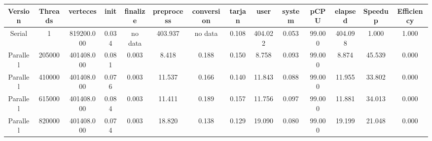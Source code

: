 \begin{tabular}{|c|c|c|c|c|c|c|c|c|c|c|c|c|c|}
\toprule
 Version &  Threads &   verteces &  init & finalize &  preprocess & conversion &  tarjan &    user &  system &   pCPU &  elapsed &  Speedup &  Efficiency \\
\midrule
  Serial &        1 & 819200.000 & 0.034 &  no data &     403.937 &    no data &   0.108 & 404.022 &   0.053 & 99.000 &  404.098 &    1.000 &       1.000 \\
Parallel &   205000 & 401408.000 & 0.081 &    0.003 &       8.418 &      0.188 &   0.150 &   8.758 &   0.093 & 99.000 &    8.874 &   45.539 &       0.000 \\
Parallel &   410000 & 401408.000 & 0.076 &    0.003 &      11.537 &      0.166 &   0.140 &  11.843 &   0.088 & 99.000 &   11.955 &   33.802 &       0.000 \\
Parallel &   615000 & 401408.000 & 0.084 &    0.003 &      11.411 &      0.189 &   0.157 &  11.756 &   0.097 & 99.000 &   11.881 &   34.013 &       0.000 \\
Parallel &   820000 & 401408.000 & 0.074 &    0.003 &      18.820 &      0.138 &   0.129 &  19.090 &   0.080 & 99.000 &   19.199 &   21.048 &       0.000 \\
\bottomrule
\end{tabular}
